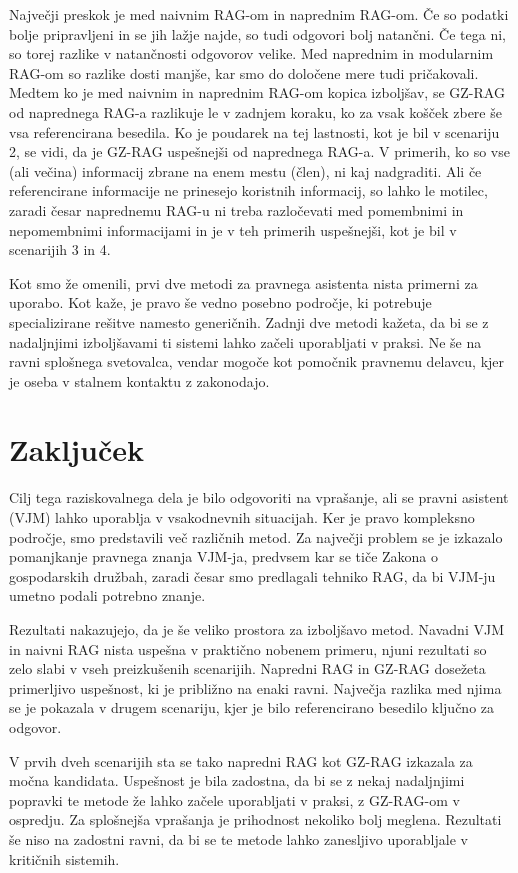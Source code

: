\documentclass[a4paper,12pt,openright]{book}
\begin{document}
Največji preskok je med naivnim RAG-om in naprednim RAG-om. Če so podatki bolje pripravljeni in se jih lažje najde, so tudi odgovori bolj natančni. Če tega ni, so torej razlike v natančnosti odgovorov velike. Med naprednim in modularnim RAG-om so razlike dosti manjše, kar smo do določene mere tudi pričakovali. Medtem ko je med naivnim in naprednim RAG-om kopica izboljšav, se GZ-RAG od naprednega RAG-a razlikuje le v zadnjem koraku, ko za vsak košček zbere še vsa referencirana besedila. Ko je poudarek na tej lastnosti, kot je bil v scenariju 2, se vidi, da je GZ-RAG uspešnejši od naprednega RAG-a. V primerih, ko so vse (ali večina) informacij zbrane na enem mestu (člen), ni kaj nadgraditi. Ali če referencirane informacije ne prinesejo koristnih informacij, so lahko le motilec, zaradi česar naprednemu RAG-u ni treba razločevati med pomembnimi in nepomembnimi informacijami in je v teh primerih uspešnejši, kot je bil v scenarijih 3 in 4.

Kot smo že omenili, prvi dve metodi za pravnega asistenta nista primerni za uporabo. Kot kaže, je pravo še vedno posebno področje, ki potrebuje specializirane rešitve namesto generičnih. Zadnji dve metodi kažeta, da bi se z nadaljnjimi izboljšavami ti sistemi lahko začeli uporabljati v praksi. Ne še na ravni splošnega svetovalca, vendar mogoče kot pomočnik pravnemu delavcu, kjer je oseba v stalnem kontaktu z zakonodajo.

\chapter{Zaključek}
\label{ch5}

Cilj tega raziskovalnega dela je bilo odgovoriti na vprašanje, ali se pravni asistent (VJM) lahko uporablja v vsakodnevnih situacijah. Ker je pravo kompleksno področje, smo predstavili več različnih metod. Za največji problem se je izkazalo pomanjkanje pravnega znanja VJM-ja, predvsem kar se tiče Zakona o gospodarskih družbah, zaradi česar smo predlagali tehniko RAG, da bi VJM-ju umetno podali potrebno znanje.

Rezultati nakazujejo, da je še veliko prostora za izboljšavo metod. Navadni VJM in naivni RAG nista uspešna v praktično nobenem primeru, njuni rezultati so zelo slabi v vseh preizkušenih scenarijih. Napredni RAG in GZ-RAG dosežeta primerljivo uspešnost, ki je približno na enaki ravni. Največja razlika med njima se je pokazala v drugem scenariju, kjer je bilo referencirano besedilo ključno za odgovor.

V prvih dveh scenarijih sta se tako napredni RAG kot GZ-RAG izkazala za močna kandidata. Uspešnost je bila zadostna, da bi se z nekaj nadaljnjimi popravki te metode že lahko začele uporabljati v praksi, z GZ-RAG-om v ospredju. Za splošnejša vprašanja je prihodnost nekoliko bolj meglena. Rezultati še niso na zadostni ravni, da bi se te metode lahko zanesljivo uporabljale v kritičnih sistemih.
\end{document}
